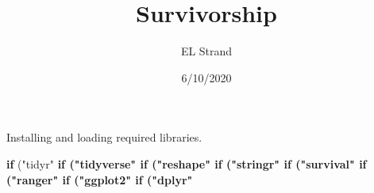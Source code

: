 \documentclass[]{article}
\title{Survivorship}
\author{EL Strand}
\date{6/10/2020}
\newenvironment{Shaded}{\begin{snugshade}}{\end{snugshade}}
\newcommand{\KeywordTok}[1]{\textcolor[rgb]{0.13,0.29,0.53}{\textbf{#1}}}
\newcommand{\StringTok}[1]{\textcolor[rgb]{0.31,0.60,0.02}{#1}}
\newcommand{\ControlFlowTok}[1]{\textcolor[rgb]{0.13,0.29,0.53}{\textbf{#1}}}
\newcommand{\OperatorTok}[1]{\textcolor[rgb]{0.81,0.36,0.00}{\textbf{#1}}}
\newcommand{\NormalTok}[1]{#1}
\begin{document}
\maketitle

Installing and loading required libraries.

\begin{Shaded}
\begin{Highlighting}[]
\ControlFlowTok{if}\NormalTok{ (}\StringTok{"tidyr"} \OperatorTok{%in%}\StringTok{ }\KeywordTok{rownames}\NormalTok{(}\KeywordTok{installed.packages}\NormalTok{()) }\OperatorTok{==}\StringTok{ 'FALSE'}\NormalTok{) }\KeywordTok{install.packages}\NormalTok{(}\StringTok{'tidyr'}\NormalTok{) }
\ControlFlowTok{if}\NormalTok{ (}\StringTok{"tidyverse"} \OperatorTok{%in%}\StringTok{ }\KeywordTok{rownames}\NormalTok{(}\KeywordTok{installed.packages}\NormalTok{()) }\OperatorTok{==}\StringTok{ 'FALSE'}\NormalTok{) }\KeywordTok{install.packages}\NormalTok{(}\StringTok{'tidyverse'}\NormalTok{) }
\ControlFlowTok{if}\NormalTok{ (}\StringTok{"reshape"} \OperatorTok{%in%}\StringTok{ }\KeywordTok{rownames}\NormalTok{(}\KeywordTok{installed.packages}\NormalTok{()) }\OperatorTok{==}\StringTok{ 'FALSE'}\NormalTok{) }\KeywordTok{install.packages}\NormalTok{(}\StringTok{'reshape'}\NormalTok{) }
\ControlFlowTok{if}\NormalTok{ (}\StringTok{"stringr"} \OperatorTok{%in%}\StringTok{ }\KeywordTok{rownames}\NormalTok{(}\KeywordTok{installed.packages}\NormalTok{()) }\OperatorTok{==}\StringTok{ 'FALSE'}\NormalTok{) }\KeywordTok{install.packages}\NormalTok{(}\StringTok{'stringr'}\NormalTok{) }
\ControlFlowTok{if}\NormalTok{ (}\StringTok{"survival"} \OperatorTok{%in%}\StringTok{ }\KeywordTok{rownames}\NormalTok{(}\KeywordTok{installed.packages}\NormalTok{()) }\OperatorTok{==}\StringTok{ 'FALSE'}\NormalTok{) }\KeywordTok{install.packages}\NormalTok{(}\StringTok{'survival'}\NormalTok{) }
\ControlFlowTok{if}\NormalTok{ (}\StringTok{"ranger"} \OperatorTok{%in%}\StringTok{ }\KeywordTok{rownames}\NormalTok{(}\KeywordTok{installed.packages}\NormalTok{()) }\OperatorTok{==}\StringTok{ 'FALSE'}\NormalTok{) }\KeywordTok{install.packages}\NormalTok{(}\StringTok{'ranger'}\NormalTok{) }
\ControlFlowTok{if}\NormalTok{ (}\StringTok{"ggplot2"} \OperatorTok{%in%}\StringTok{ }\KeywordTok{rownames}\NormalTok{(}\KeywordTok{installed.packages}\NormalTok{()) }\OperatorTok{==}\StringTok{ 'FALSE'}\NormalTok{) }\KeywordTok{install.packages}\NormalTok{(}\StringTok{'ggplot2'}\NormalTok{) }
\ControlFlowTok{if}\NormalTok{ (}\StringTok{"dplyr"} \OperatorTok{%in%}\StringTok{ }\KeywordTok{rownames}\NormalTok{(}\KeywordTok{installed.packages}\NormalTok{()) }\OperatorTok{==}\StringTok{ 'FALSE'}\NormalTok{) }\KeywordTok{install.packages}\NormalTok{(}\StringTok{'dplyr'}\NormalTok{) }
}}}}}}}}
\end{Highlighting}
\end{Shaded}
\end{document}
